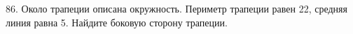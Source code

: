 86. Около трапеции описана окружность. Периметр трапеции равен 22, средняя линия равна 5. Найдите боковую сторону трапеции.\\
